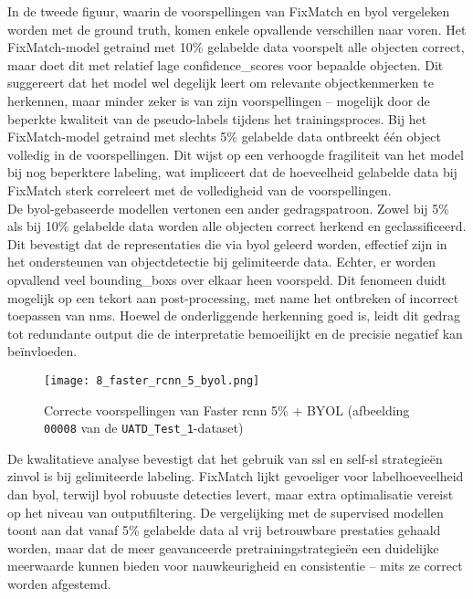 In de tweede figuur, waarin de voorspellingen van FixMatch en \gls{byol} vergeleken worden met de ground truth, komen enkele opvallende verschillen naar voren. Het FixMatch-model getraind met 10\% gelabelde data voorspelt alle objecten correct, maar doet dit met relatief lage \glspl{confidence_score} voor bepaalde objecten. Dit suggereert dat het model wel degelijk leert om relevante objectkenmerken te herkennen, maar minder zeker is van zijn voorspellingen -- mogelijk door de beperkte kwaliteit van de pseudo-labels tijdens het trainingsproces. Bij het FixMatch-model getraind met slechts 5\% gelabelde data ontbreekt één object volledig in de voorspellingen. Dit wijst op een verhoogde fragiliteit van het model bij nog beperktere labeling, wat impliceert dat de hoeveelheid gelabelde data bij FixMatch sterk correleert met de volledigheid van de voorspellingen. \\

De \gls{byol}-gebaseerde modellen vertonen een ander gedragspatroon. Zowel bij 5\% als bij 10\% gelabelde data worden alle objecten correct herkend en geclassificeerd. Dit bevestigt dat de representaties die via \gls{byol} geleerd worden, effectief zijn in het ondersteunen van objectdetectie bij gelimiteerde data. Echter, er worden opvallend veel \glspl{bounding_box} over elkaar heen voorspeld. Dit fenomeen duidt mogelijk op een tekort aan post-processing, met name het ontbreken of incorrect toepassen van \gls{nms}. Hoewel de onderliggende herkenning goed is, leidt dit gedrag tot redundante output die de interpretatie bemoeilijkt en de precisie negatief kan beïnvloeden.

\begin{figure}[H]
    \centering
    \texttt{[image: 8\_faster\_rcnn\_5\_byol.png]}
    \caption[Correcte voorspellingen van BYOL 5\%]{\label{fig:faster_rcnn_correct}Correcte voorspellingen van Faster \gls{rcnn} 5\% + BYOL (afbeelding \texttt{00008} van de \texttt{UATD\_Test\_1}-dataset)}
\end{figure}

De kwalitatieve analyse bevestigt dat het gebruik van \gls{ssl} en \gls{self-sl} strategieën zinvol is bij gelimiteerde labeling. FixMatch lijkt gevoeliger voor labelhoeveelheid dan \gls{byol}, terwijl \gls{byol} robuuste detecties levert, maar extra optimalisatie vereist op het niveau van outputfiltering. De vergelijking met de supervised modellen toont aan dat vanaf 5\% gelabelde data al vrij betrouwbare prestaties gehaald worden, maar dat de meer geavanceerde pretrainingstrategieën een duidelijke meerwaarde kunnen bieden voor nauwkeurigheid en consistentie -- mits ze correct worden afgestemd.